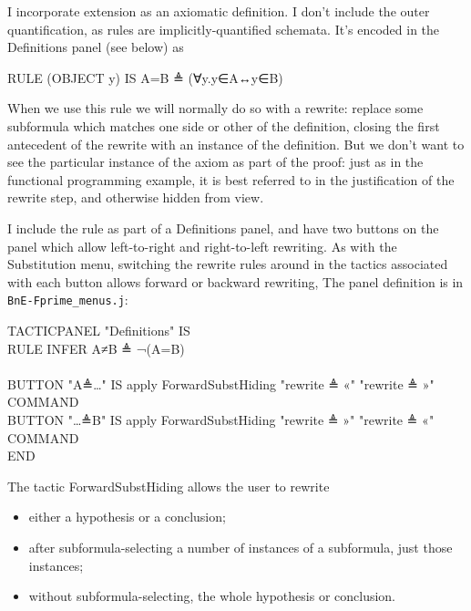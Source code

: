 I incorporate extension as an axiomatic definition. I don't include the outer quantification, as rules are implicitly-quantified schemata. It's encoded in the Definitions panel (see below) as
\begin{japeish}
RULE (OBJECT y) IS A=B ≜ (∀y.y∈A↔y∈B)
\end{japeish}
When we use this rule we will normally do so with a rewrite: replace some subformula which matches one side or other of the definition, closing the first antecedent of the rewrite with an instance of the definition. But we don't want to see the particular instance of the axiom as part of the proof: just as in the functional programming example, it is best referred to in the justification of the rewrite step, and otherwise hidden from view.

I include the rule as part of a Definitions panel, and have two buttons on the panel which allow left-to-right and right-to-left rewriting. As with the Substitution menu, switching the rewrite rules around in the tactics associated with each button allows forward or backward rewriting, The panel definition is in \texttt{BnE-Fprime\_menus.j}:
\begin{japeish}
TACTICPANEL "Definitions" IS \\
\tab RULE INFER A≠B ≜ ¬(A=B) \\
\tab  \\
\tab BUTTON "A≜…" IS apply ForwardSubstHiding "rewrite ≜ «" "rewrite ≜ »"  COMMAND \\
\tab BUTTON "…≜B" IS apply ForwardSubstHiding "rewrite ≜ »" "rewrite ≜ «"  COMMAND \\
END
\end{japeish}

The tactic ForwardSubstHiding allows the user to rewrite
\begin{itemize}
\item either a hypothesis or a conclusion;
\item after subformula-selecting a number of instances of a subformula, just those instances;
\item without subformula-selecting, the whole hypothesis or conclusion.
\end{itemize}

